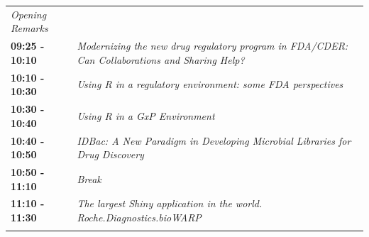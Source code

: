 \documentclass[]{book}
\theoremstyle{definition}
\theoremstyle{definition}
\theoremstyle{definition}
\theoremstyle{remark}
\begin{document}
\begin{longtable}[]{@{}ll@{}}
\begin{minipage}[t]{0.47\columnwidth}
\emph{Opening Remarks}\strut
\end{minipage}\tabularnewline
\begin{minipage}[t]{0.47\columnwidth}\raggedright
\textbf{09:25 - 10:10}\strut
\end{minipage} & \begin{minipage}[t]{0.47\columnwidth}\raggedright
\emph{Modernizing the new drug regulatory program in FDA/CDER:~ Can
Collaborations and Sharing Help?}\strut
\end{minipage}\tabularnewline
\begin{minipage}[t]{0.47\columnwidth}\raggedright
\textbf{10:10 - 10:30}\strut
\end{minipage} & \begin{minipage}[t]{0.47\columnwidth}\raggedright
\emph{Using R in a regulatory environment: some FDA perspectives}\strut
\end{minipage}\tabularnewline
\begin{minipage}[t]{0.47\columnwidth}\raggedright
\textbf{10:30 - 10:40}\strut
\end{minipage} & \begin{minipage}[t]{0.47\columnwidth}\raggedright
\emph{Using R in a GxP Environment}\strut
\end{minipage}\tabularnewline
\begin{minipage}[t]{0.47\columnwidth}\raggedright
\textbf{10:40 - 10:50}\strut
\end{minipage} & \begin{minipage}[t]{0.47\columnwidth}\raggedright
\emph{IDBac: A New Paradigm in Developing Microbial Libraries for Drug
Discovery}\strut
\end{minipage}\tabularnewline
\begin{minipage}[t]{0.47\columnwidth}\raggedright
\textbf{10:50 - 11:10}\strut
\end{minipage} & \begin{minipage}[t]{0.47\columnwidth}\raggedright
\emph{Break}\strut
\end{minipage}\tabularnewline
\begin{minipage}[t]{0.47\columnwidth}\raggedright
\textbf{11:10 - 11:30}\strut
\end{minipage} & \begin{minipage}[t]{0.47\columnwidth}\raggedright
\emph{The largest Shiny application in the world.
Roche.Diagnostics.bioWARP}\strut
\end{minipage}\tabularnewline
\begin{minipage}[t]{0.47\columnwidth}\raggedright

\end{minipage}
\end{longtable}
\end{document}
